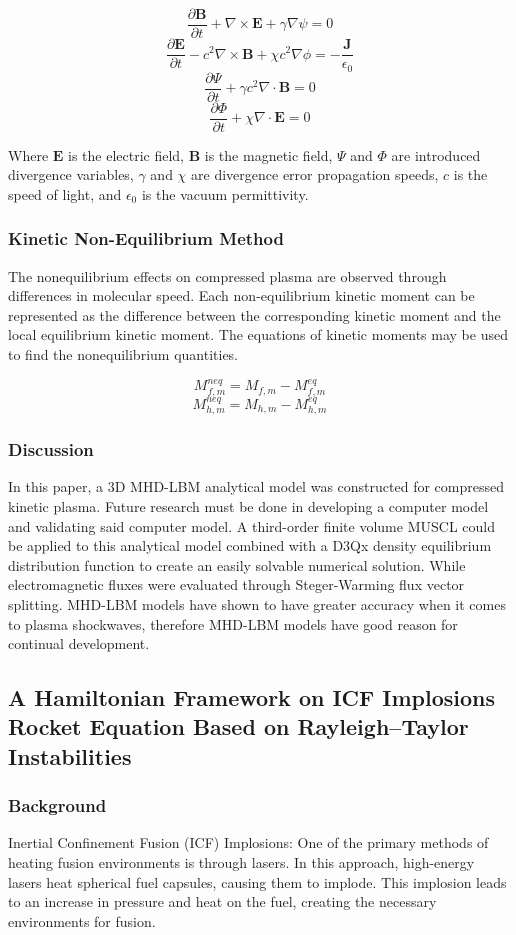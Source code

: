 $$\frac{\partial \mathbf{B}}{\partial t} + \nabla \times \mathbf{E} + \gamma \nabla \psi = 0$$
$$\frac{\partial \mathbf{E}}{\partial t} - c^2 \nabla \times \mathbf{B} + \chi c^2 \nabla \phi = - \frac{\mathbf{J}}{\epsilon_0}$$
$$\frac{\partial \Psi}{\partial t} + \gamma c^2 \nabla \cdot \mathbf{B} = 0$$
$$\frac{\partial \Phi}{\partial t} + \chi \nabla \cdot \mathbf{E} = 0$$

Where $\mathbf{E}$ is the electric field, $\mathbf{B}$ is the magnetic field, $\Psi$ and $\Phi$ are introduced divergence variables, $\gamma$ and $\chi$ are divergence error propagation speeds, $c$ is the speed of light, and $\epsilon_0$ is the vacuum permittivity.

\subsubsection{Kinetic Non-Equilibrium Method}
The nonequilibrium effects on compressed plasma are observed through differences in molecular speed. Each non-equilibrium kinetic moment can be represented as the difference between the corresponding kinetic moment and the local equilibrium kinetic moment. The equations of kinetic moments may be used to find the nonequilibrium quantities.

$$M_{f,m}^{neq} = M_{f,m} - M_{f,m}^{eq}$$
$$M_{h,m}^{neq} = M_{h,m} - M_{h,m}^{eq}$$

\subsubsection{Discussion}
In this paper, a 3D MHD-LBM analytical model was constructed for compressed kinetic plasma. Future research must be done in developing a computer model and validating said computer model. A third-order finite volume MUSCL could be applied to this analytical model combined with a D3Qx density equilibrium distribution function to create an easily solvable numerical solution. While electromagnetic fluxes were evaluated through Steger-Warming flux vector splitting. MHD-LBM models have shown to have greater accuracy when it comes to plasma shockwaves, therefore MHD-LBM models have good reason for continual development.
\subsection{A Hamiltonian Framework on ICF Implosions Rocket Equation Based on Rayleigh–Taylor Instabilities
}
\subsubsection{Background}
\par Inertial Confinement Fusion (ICF) Implosions:
One of the primary methods of heating fusion environments is through lasers. In this approach, high-energy lasers heat spherical fuel capsules, causing them to implode. This implosion leads to an increase in pressure and heat on the fuel, creating the necessary environments for fusion.

